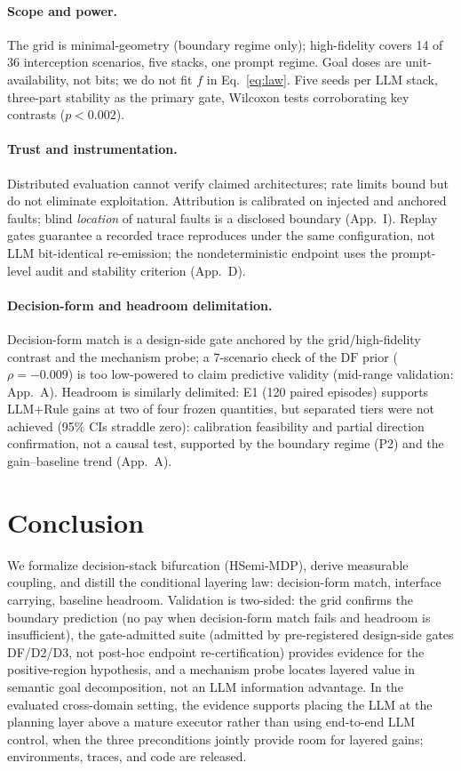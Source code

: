 \documentclass[sigconf,anonymous]{aamas}
\newcommand{\sapp}[1]{App.~#1}
\begin{document}
\paragraph{Scope and power.}
The grid is minimal-geometry (boundary regime only); high-fidelity covers 14 of 36 interception scenarios, five stacks, one prompt regime. Goal doses are unit-availability, not bits; we do not fit $f$ in Eq.~\ref{eq:law}. Five seeds per LLM stack, three-part stability as the primary gate, Wilcoxon tests corroborating key contrasts ($p<0.002$).

\paragraph{Trust and instrumentation.}
Distributed evaluation cannot verify claimed architectures; rate limits bound but do not eliminate exploitation. Attribution is calibrated on injected and anchored faults; blind \emph{location} of natural faults is a disclosed boundary (\sapp{I}). Replay gates guarantee a recorded trace reproduces under the same configuration, not LLM bit-identical re-emission; the nondeterministic endpoint uses the prompt-level audit and stability criterion (\sapp{D}).

\paragraph{Decision-form and headroom delimitation.}
Decision-form match is a design-side gate anchored by the grid/high-fidelity contrast and the mechanism probe; a 7-scenario check of the $\mathrm{DF}$ prior ($\rho=-0.009$) is too low-powered to claim predictive validity (mid-range validation: \sapp{A}). Headroom is similarly delimited: E1 (120 paired episodes) supports LLM+Rule gains at two of four frozen quantities, but separated tiers were not achieved (95\% CIs straddle zero): calibration feasibility and partial direction confirmation, not a causal test, supported by the boundary regime (P2) and the gain--baseline trend (\sapp{A}).

\section{Conclusion}\label{sec:conclusion}

We formalize decision-stack bifurcation (HSemi-MDP), derive measurable coupling, and distill the conditional layering law: decision-form match, interface carrying, baseline headroom. Validation is two-sided: the grid confirms the boundary prediction (no pay when decision-form match fails and headroom is insufficient), the gate-admitted suite (admitted by pre-registered design-side gates DF/D2/D3, not post-hoc endpoint re-certification) provides evidence for the positive-region hypothesis, and a mechanism probe locates layered value in semantic goal decomposition, not an LLM information advantage. In the evaluated cross-domain setting, the evidence supports placing the LLM at the planning layer above a mature executor rather than using end-to-end LLM control, when the three preconditions jointly provide room for layered gains; environments, traces, and code are released.

\balance


\end{document}
